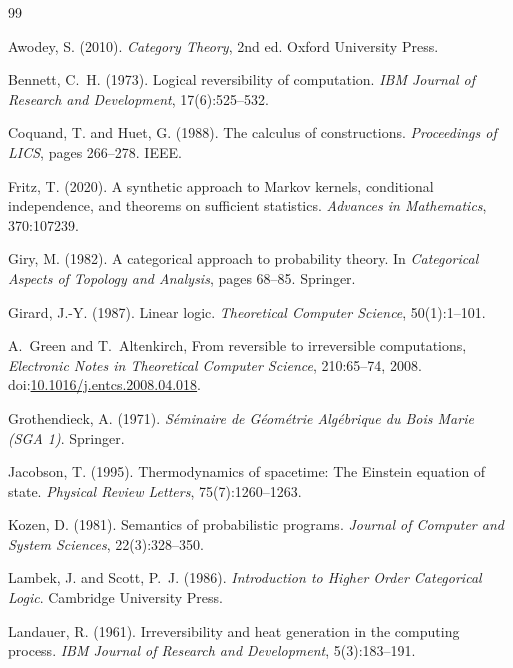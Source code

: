 \documentclass[12pt, a4paper]{article}
\theoremstyle{definition}
\theoremstyle{remark}
\begin{document}

\begin{thebibliography}{99}

Awodey, S. (2010). \emph{Category Theory}, 2nd ed. Oxford University Press.

Bennett, C.~H. (1973). Logical reversibility of computation.
\emph{IBM Journal of Research and Development}, 17(6):525--532.

Coquand, T. and Huet, G. (1988). The calculus of constructions.
\emph{Proceedings of LICS}, pages 266--278. IEEE.

Fritz, T. (2020). A synthetic approach to Markov kernels, conditional independence,
and theorems on sufficient statistics.
\emph{Advances in Mathematics}, 370:107239.

Giry, M. (1982). A categorical approach to probability theory. In
\emph{Categorical Aspects of Topology and Analysis}, pages 68--85. Springer.

Girard, J.-Y. (1987). Linear logic.
\emph{Theoretical Computer Science}, 50(1):1--101.

A.~Green and T.~Altenkirch, From reversible to irreversible computations,
\emph{Electronic Notes in Theoretical Computer Science}, 210:65--74, 2008.
\newblock doi:\href{https://doi.org/10.1016/j.entcs.2008.04.018}{10.1016/j.entcs.2008.04.018}.

Grothendieck, A. (1971). \emph{Séminaire de Géométrie Algébrique du Bois Marie (SGA 1)}.
Springer.

Jacobson, T. (1995). Thermodynamics of spacetime: The Einstein equation of state.
\emph{Physical Review Letters}, 75(7):1260--1263.

Kozen, D. (1981). Semantics of probabilistic programs.
\emph{Journal of Computer and System Sciences}, 22(3):328--350.

Lambek, J. and Scott, P.~J. (1986).
\emph{Introduction to Higher Order Categorical Logic}. Cambridge University Press.

Landauer, R. (1961). Irreversibility and heat generation in the computing process.
\emph{IBM Journal of Research and Development}, 5(3):183--191.


\end{thebibliography}
\end{document}
